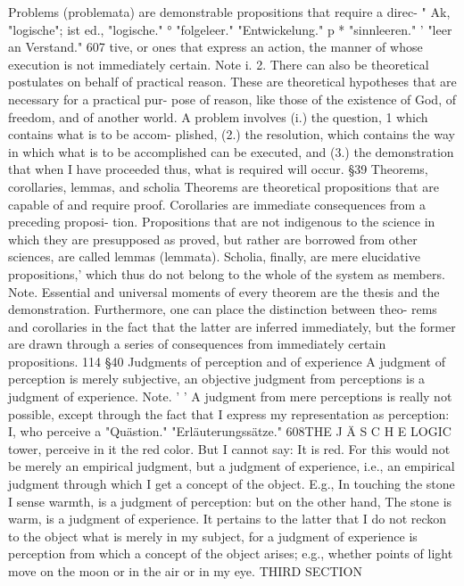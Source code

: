 Problems (problemata) are demonstrable propositions that require a direc-
" Ak, "logische"; ist ed., "logische."
° "folgeleer."
"Entwickelung."
p
* "sinnleeren."
' "leer an Verstand."
607
tive, or ones that express an action, the manner of whose execution is not
immediately certain.
Note i.
2.
There can also be theoretical postulates on behalf of practical reason.
These are theoretical hypotheses that are necessary for a practical pur-
pose of reason, like those of the existence of God, of freedom, and of
another world.
A problem involves (i.) the question, 1 which contains what is to be accom-
plished, (2.) the resolution, which contains the way in which what is to be
accomplished can be executed, and (3.) the demonstration that when I
have proceeded thus, what is required will occur.
§39
Theorems, corollaries, lemmas, and scholia
Theorems are theoretical propositions that are capable of and require
proof. Corollaries are immediate consequences from a preceding proposi-
tion. Propositions that are not indigenous to the science in which they are
presupposed as proved, but rather are borrowed from other sciences, are
called lemmas (lemmata). Scholia, finally, are mere elucidative propositions,'
which thus do not belong to the whole of the system as members.
Note.
Essential and universal moments of every theorem are the thesis and the
demonstration. Furthermore, one can place the distinction between theo-
rems and corollaries in the fact that the latter are inferred immediately, but
the former are drawn through a series of consequences from immediately
certain propositions.
114
§40
Judgments of perception and of experience
A judgment of perception is merely subjective, an objective judgment from
perceptions is a judgment of experience.
Note.
'
'
A judgment from mere perceptions is really not possible, except through
the fact that I express my representation as perception: I, who perceive a
"Quästion."
"Erläuterungssätze."
608THE J Ä S C H E LOGIC
tower, perceive in it the red color. But I cannot say: It is red. For this would
not be merely an empirical judgment, but a judgment of experience, i.e., an
empirical judgment through which I get a concept of the object. E.g., In
touching the stone I sense warmth, is a judgment of perception: but on the
other hand, The stone is warm, is a judgment of experience. It pertains to
the latter that I do not reckon to the object what is merely in my subject, for
a judgment of experience is perception from which a concept of the object
arises; e.g., whether points of light move on the moon or in the air or in my
eye.
THIRD SECTION
